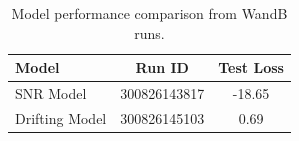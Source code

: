 \begin{table}[htbp]
\centering
\caption{Model performance comparison from WandB runs.}
\label{tab:wandb_comparison}
\begin{tabular}{lcc}
\toprule
\textbf{Model} & \textbf{Run ID} & \textbf{Test Loss} \\
\midrule
SNR Model      & 300826143817    & -18.65 \\
Drifting Model & 300826145103    & 0.69 \\
\bottomrule
\end{tabular}
\end{table}
